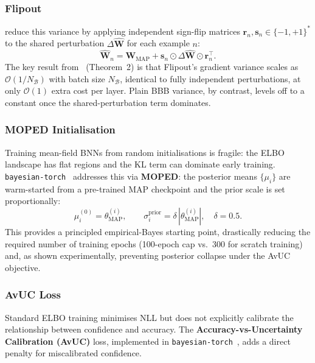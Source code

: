 \documentclass[12pt,a4paper]{article}
\newcommand{\MAP}{\text{MAP}}
\begin{document}
\subsubsection{Flipout}

\citet{wen2018flipout} reduce this variance by applying independent sign-flip
matrices $\mathbf{r}_n,\mathbf{s}_n\in\{-1,+1\}^*$ to the shared
perturbation $\Delta\hat{\mathbf{W}}$ for each example $n$:
\begin{equation}
  \hat{\mathbf{W}}_n
    = \mathbf{W}_{\MAP} + \mathbf{s}_n \odot \Delta\hat{\mathbf{W}}
      \odot \mathbf{r}_n^{\!\top}.
\end{equation}
The key result from~\citet{wen2018flipout} (Theorem~2) is that Flipout's
gradient variance scales as $\mathcal{O}(1/N_{\mathcal{B}})$ with batch size
$N_{\mathcal{B}}$, identical to fully independent perturbations, at only
$\mathcal{O}(1)$ extra cost per layer. Plain BBB variance, by contrast,
levels off to a constant once the shared-perturbation term dominates.

\subsubsection{MOPED Initialisation}

Training mean-field BNNs from random initialisations is fragile: the ELBO
landscape has flat regions and the KL term can dominate early training.
\texttt{bayesian-torch}~\citep{intel2021bayesiantorch} addresses this via
\textbf{MOPED}: the posterior means $\{\mu_i\}$ are warm-started from a
pre-trained MAP checkpoint and the prior scale is set proportionally:
\begin{equation}
  \mu_i^{(0)} = \theta_{\MAP}^{(i)}, \qquad
  \sigma_i^{\text{prior}} = \delta\,|\theta_{\MAP}^{(i)}|, \quad \delta=0.5.
\end{equation}
This provides a principled empirical-Bayes starting point, drastically
reducing the required number of training epochs (100-epoch cap vs.\ 300 for
scratch training) and, as shown experimentally, preventing posterior collapse
under the AvUC objective.

\subsubsection{AvUC Loss}
\label{sec:theory:avuc}

Standard ELBO training minimises NLL but does not explicitly calibrate the
relationship between confidence and accuracy. The
\textbf{Accuracy-vs-Uncertainty Calibration (AvUC)} loss, implemented in
\texttt{bayesian-torch}~\citep{intel2021bayesiantorch}, adds a direct
penalty for miscalibrated confidence.
\end{document}
